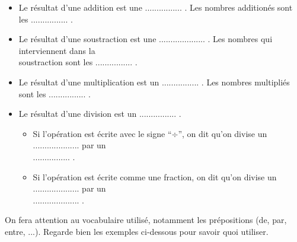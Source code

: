 \documentclass[a4paper]{article}
\begin{document}
\begin{cours}[Vocabulaire]
	\begin{itemize}
		\item Le résultat d'une addition est une ................ . Les nombres additionés sont les ................ .
		\item Le résultat d'une soustraction est une .................... . Les nombres qui interviennent dans la\\[0.3em] soustraction sont les ................ .
		\item Le résultat d'une multiplication est un ................ . Les nombres multipliés sont les ................ .
		\item Le résultat d'une division est un ................ .
		      \begin{itemize}
			      \item Si l'opération est écrite avec le signe “$÷$”, on dit qu'on divise un .................... par un\\[0.3em] ................ .
			      \item Si l'opération est écrite comme une fraction, on dit qu'on divise un ....................  par un\\[0.3em] .................... .
		      \end{itemize}
	\end{itemize} \vspace{1em}

	On fera attention au vocabulaire utilisé, notamment les prépositions (de, par, entre, ...). Regarde bien les exemples ci-dessous pour savoir quoi utiliser.
\end{cours}
\end{document}
